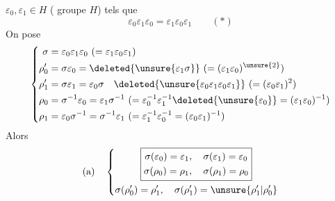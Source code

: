 $\varepsilon_0,\varepsilon_1\in H$ ( groupe $H$) tels que
\[\boxed{\varepsilon_0\varepsilon_1\varepsilon_0=\varepsilon_1\varepsilon_0\varepsilon_1}\qquad(*)\]
On pose
\[
\left\{\begin{aligned}
\sigma&=\varepsilon_0\varepsilon_1\varepsilon_0\ (=\varepsilon_1\varepsilon_0\varepsilon_1)\\
\rho'_0&=\sigma\varepsilon_0=\deleted{\unsure{\varepsilon_1\sigma}}\ (= (\varepsilon_1\varepsilon_0)^{\unsure{2}})\\
\rho'_1&=\sigma\varepsilon_1=\varepsilon_0\sigma\quad\deleted{\unsure{\varepsilon_0\varepsilon_1\varepsilon_0\varepsilon_1}}\ (=(\varepsilon_0\varepsilon_1)^2)\\
\rho_0&=\sigma^{-1}\varepsilon_0=\varepsilon_1\sigma^{-1}\ (=\varepsilon_0^{-1}\varepsilon_1^{-1}\deleted{\unsure{\varepsilon_0}}=(\varepsilon_1\varepsilon_0)^{-1})\\
\rho_1&=\varepsilon_0\sigma^{-1}=\sigma^{-1}\varepsilon_1\ (=\varepsilon_1^{-1}\varepsilon_0^{-1}=(\varepsilon_0\varepsilon_1)^{-1})
\end{aligned}\right.
\]
\margin{[donc $\sigma(\varepsilon_0)=\varepsilon_1,\sigma(\varepsilon_1)=\varepsilon_0,\ \sigma^2\in\unsure{\operatorname{Centr}}(H)$\par
$\operatorname{int}(\sigma)=\operatorname{int}(\sigma^{-1})$]}
Alors\quad{}
\[
\text{(a)}\quad\left\{\begin{gathered}
\boxed{\begin{gathered}\sigma(\varepsilon_0)=\varepsilon_1,\quad\sigma(\varepsilon_1)=\varepsilon_0\\
\sigma(\rho_0)=\rho_1,\quad\sigma(\rho_1)=\rho_0\end{gathered}}\\
\sigma(\rho'_0)=\rho'_1,\quad\sigma(\rho'_1)=\unsure{\rho'_1|\rho'_0}
\end{gathered}\right.
\]
